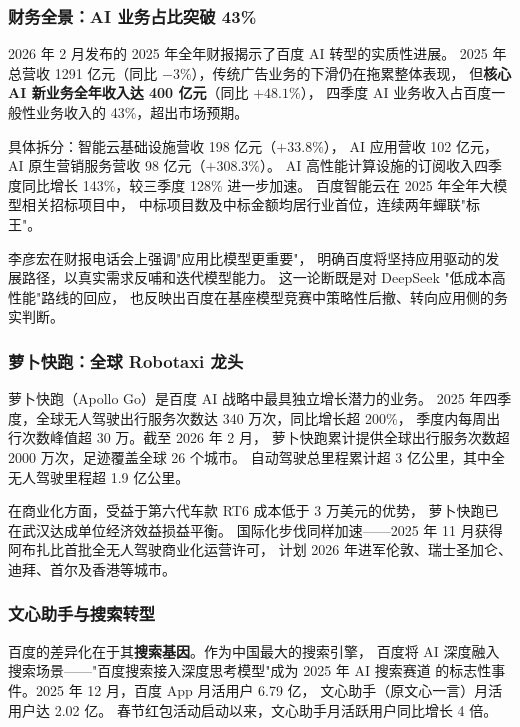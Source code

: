 \subsubsection{财务全景：AI 业务占比突破 43\%}

2026 年 2 月发布的 2025 年全年财报揭示了百度 AI 转型的实质性进展。
2025 年总营收 1291 亿元（同比 $-3\%$），传统广告业务的下滑仍在拖累整体表现，
但\textbf{核心 AI 新业务全年收入达 400 亿元}（同比 $+48.1\%$），
四季度 AI 业务收入占百度一般性业务收入的 43\%，超出市场预期。

具体拆分：智能云基础设施营收 198 亿元（$+33.8\%$），
AI 应用营收 102 亿元，AI 原生营销服务营收 98 亿元（$+308.3\%$）。
AI 高性能计算设施的订阅收入四季度同比增长 143\%，较三季度 128\% 进一步加速。
百度智能云在 2025 年全年大模型相关招标项目中，
中标项目数及中标金额均居行业首位，连续两年蟬联"标王"。

李彦宏在财报电话会上强调"应用比模型更重要"，
明确百度将坚持应用驱动的发展路径，以真实需求反哺和迭代模型能力。
这一论断既是对 DeepSeek "低成本高性能"路线的回应，
也反映出百度在基座模型竞赛中策略性后撤、转向应用侧的务实判断。

\subsubsection{萝卜快跑：全球 Robotaxi 龙头}

萝卜快跑（Apollo Go）是百度 AI 战略中最具独立增长潜力的业务。
2025 年四季度，全球无人驾驶出行服务次数达 340 万次，同比增长超 200\%，
季度内每周出行次数峰值超 30 万。截至 2026 年 2 月，
萝卜快跑累计提供全球出行服务次数超 2000 万次，足迹覆盖全球 26 个城市。
自动驾驶总里程累计超 3 亿公里，其中全无人驾驶里程超 1.9 亿公里。

在商业化方面，受益于第六代车款 RT6 成本低于 3 万美元的优势，
萝卜快跑已在武汉达成单位经济效益损益平衡。
国际化步伐同样加速——2025 年 11 月获得阿布扎比首批全无人驾驶商业化运营许可，
计划 2026 年进军伦敦、瑞士圣加仑、迪拜、首尔及香港等城市。

\subsubsection{文心助手与搜索转型}

百度的差异化在于其\textbf{搜索基因}。作为中国最大的搜索引擎，
百度将 AI 深度融入搜索场景——"百度搜索接入深度思考模型"成为 2025 年 AI 搜索赛道
的标志性事件。2025 年 12 月，百度 App 月活用户 6.79 亿，
文心助手（原文心一言）月活用户达 2.02 亿。
春节红包活动启动以来，文心助手月活跃用户同比增长 4 倍。

